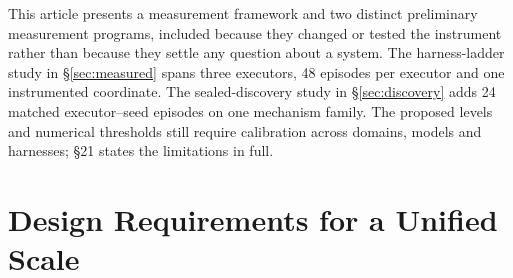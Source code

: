 \documentclass[11pt]{article}
\theoremstyle{definition}
\begin{document}
This article presents a measurement framework and two distinct preliminary measurement programs, included because they changed or tested the instrument rather than because they settle any question about a system. The harness-ladder study in \S\ref{sec:measured} spans three executors, 48 episodes per executor and one instrumented coordinate. The sealed-discovery study in \S\ref{sec:discovery} adds 24 matched executor--seed episodes on one mechanism family. The proposed levels and numerical thresholds still require calibration across domains, models and harnesses; \S21 states the limitations in full.

\section{Design Requirements for a Unified Scale}
\end{document}
